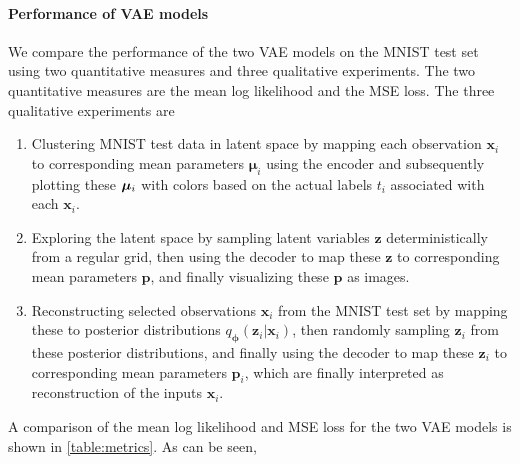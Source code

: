 \paragraph{Performance of VAE models}
We compare the performance of the two VAE models on the MNIST test set using two quantitative measures and three qualitative experiments. The two quantitative measures are the mean log likelihood and the MSE loss. The three qualitative experiments are
\begin{enumerate}
    \item Clustering MNIST test data in latent space by mapping each observation $\bm{x}_i$ to corresponding mean parameters $\bm{\mu}_i$ using the encoder and subsequently plotting these $\bm{\mu_}i$ with colors based on the actual labels $t_i$ associated with each $\bm{x}_i$.
    \item Exploring the latent space by sampling latent variables $\bm{z}$ deterministically from a regular grid, then using the decoder to map these $\bm{z}$ to corresponding mean parameters $\bm{p}$,  and finally visualizing these $\bm{p}$ as images.
    \item Reconstructing selected observations $\bm{x}_i$ from the MNIST test set by mapping these to posterior distributions $q_{\bm{\phi}}(\bm{z}_i|\bm{x}_i)$, then randomly sampling $\bm{z}_i$ from these posterior distributions, and finally using the decoder to map these $\bm{z}_i$ to corresponding mean parameters $\bm{p}_i$, which are finally interpreted as reconstruction of the inputs $\bm{x}_i$.
\end{enumerate}
A comparison of the mean log likelihood and MSE loss for the two VAE models is shown in \cref{table:metrics}. As can be seen, 